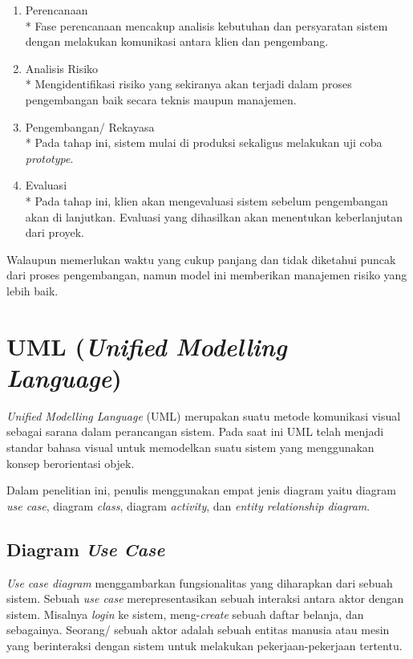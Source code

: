 \begin{enumerate}
	\item Perencanaan
		\\* Fase perencanaan mencakup analisis kebutuhan dan persyaratan sistem dengan melakukan komunikasi antara klien dan pengembang.
	\item Analisis Risiko
		\\* Mengidentifikasi risiko yang sekiranya akan terjadi dalam proses pengembangan baik secara teknis maupun manajemen.
	\item Pengembangan/ Rekayasa
		\\* Pada tahap ini, sistem mulai di produksi sekaligus melakukan uji coba \emph{prototype}.
	\item Evaluasi
		\\* Pada tahap ini, klien akan mengevaluasi sistem sebelum pengembangan akan di lanjutkan. Evaluasi yang dihasilkan akan menentukan keberlanjutan dari proyek.
\end{enumerate}

Walaupun memerlukan waktu yang cukup panjang dan tidak diketahui puncak dari proses pengembangan, namun model ini memberikan manajemen risiko yang lebih baik.


\section{UML (\emph{Unified Modelling Language})}
\emph{Unified Modelling Language} (UML) merupakan suatu metode komunikasi visual sebagai sarana dalam perancangan sistem. Pada saat ini UML telah menjadi standar bahasa visual untuk memodelkan suatu sistem yang menggunakan konsep berorientasi objek.

Dalam penelitian ini, penulis menggunakan empat jenis diagram yaitu diagram \emph{use case}, diagram \emph{class}, diagram \emph{activity}, dan \textit{entity relationship diagram}.

\subsection{Diagram \emph{Use Case}} 

\emph{Use case diagram} menggambarkan fungsionalitas yang diharapkan dari sebuah sistem. Sebuah \emph{use case} merepresentasikan sebuah interaksi antara aktor dengan sistem. Misalnya \emph{login} ke sistem, meng-\emph{create} sebuah daftar belanja, dan sebagainya.  Seorang/ sebuah aktor adalah sebuah entitas manusia atau mesin yang berinteraksi dengan sistem untuk melakukan pekerjaan-pekerjaan tertentu.

